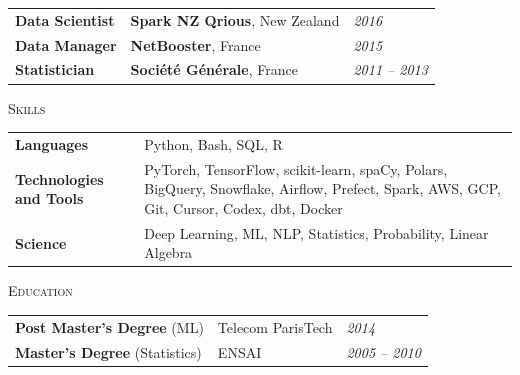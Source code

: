 \documentclass[letterpaper,11pt]{article}
\renewcommand{\section}[1]{{\vspace{0.18cm}}{\scshape\color{blue}#1}{\color{blue}\hrulefill}{\vspace{0.15cm}}}
\begin{document}
\begin{tabular}{p{7cm}p{6cm}p{5cm}}
  \hspace{-0.7em} \textbf{Data Scientist} & \textbf{\small{Spark NZ \textbar{} Qrious}}\scriptsize{, New Zealand} & \hfill \textit{\small{2016}} \\[1em]
  \hspace{-0.7em} \textbf{Data Manager} & \textbf{\small{NetBooster}}\scriptsize{, France} & \hfill \textit{\small{2015}} \\[1em]
  \hspace{-0.7em} \textbf{Statistician} & \textbf{\small{Société Générale}}\scriptsize{, France} & \hfill \textit{\small{2011 -- 2013}}
\end{tabular} 

\newpage
\renewcommand{\section}[1]{{\vspace{0.28cm}}{\scshape\color{blue}#1}{\color{blue}\hrulefill}{\vspace{0.16cm}}}
\vspace{-0.28cm}
\section{Skills}

\begin{tabular}{p{7cm}p{11.5cm}}
  \hspace{-0.7em} \textbf{\small{Languages}} & \small{Python, Bash, SQL, R} \\[0.45em]
  \hspace{-0.7em} \textbf{\small{Technologies and Tools}} & \small{PyTorch, TensorFlow, scikit-learn, spaCy, Polars, BigQuery, Snowflake, Airflow, Prefect, Spark, AWS, GCP, Git, Cursor, Codex, dbt, Docker} \\[0.45em]
  \hspace{-0.7em} \textbf{\small{Science}} & \small{Deep Learning, ML, NLP, Statistics, Probability, Linear Algebra}
\end{tabular}

\section{Education}

\begin{tabular}{p{7cm}p{6cm}p{5cm}}
  \hspace{-0.7em} \textbf{\small{Post Master's Degree}} (\small{ML}) & \small{Telecom ParisTech} & \hfill \textit{\small{2014}} \\[0.45em]
  \hspace{-0.7em} \textbf{\small{Master's Degree}} (\small{Statistics}) & \small{ENSAI} & \hfill \textit{\small{2005 -- 2010}}
\end{tabular}
\end{document}
